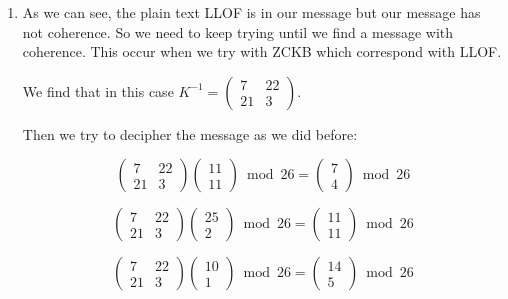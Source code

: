 \documentclass[titlepage, 12pt]{article}
\numberwithin{equation}{section}%
\numberwithin{figure}{section}%
\numberwithin{table}{section}%
\begin{document}
\begin{enumerate}
		\item As we can see, the plain text LLOF is in our message but our message has not coherence. So we need to keep trying until we find a message with coherence. This occur when we try with ZCKB which correspond with LLOF.\bigskip
		
		We find that in this case $K^{-1} = 
		\left(\begin{smallmatrix}
		7 & 22 \\
		21 & 3
		\end{smallmatrix}\right)$.\bigskip
		
		Then we try to decipher the message as we did before:
		
		\begin{equation*}
			\begin{pmatrix}
			7 & 22 \\
			21 & 3
			\end{pmatrix}
			\begin{pmatrix}
			11 \\
			11
			\end{pmatrix}\bmod{26} = 
			\begin{pmatrix}
			7 \\
			4
			\end{pmatrix}\bmod{26}
		\end{equation*}
		
		\begin{equation*}
			\begin{pmatrix}
			7 & 22 \\
			21 & 3
			\end{pmatrix}
			\begin{pmatrix}
			25 \\
			2
			\end{pmatrix}\bmod{26} = 
			\begin{pmatrix}
			11 \\
			11
			\end{pmatrix}\bmod{26}
		\end{equation*}
		
		\begin{equation*}
			\begin{pmatrix}
			7 & 22 \\
			21 & 3
			\end{pmatrix}
			\begin{pmatrix}
			10 \\
			1
			\end{pmatrix}\bmod{26} = 
			\begin{pmatrix}
			14 \\
			5
			\end{pmatrix}\bmod{26}
		\end{equation*}
		

\end{enumerate}
\end{document}
